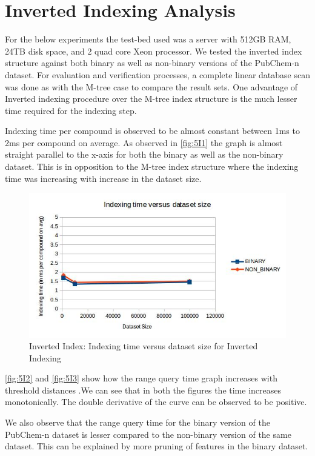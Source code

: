 \section{Inverted Indexing Analysis}

For the below experiments the test-bed used was a server with 512GB RAM, 24TB disk space, and 2 quad core Xeon processor. We tested the inverted index structure against both binary as well as non-binary versions of the PubChem-n dataset. For evaluation and verification processes, a complete linear database scan was done as with the M-tree case to compare the result sets. One advantage of Inverted indexing procedure over the M-tree index structure is the much lesser time required for the indexing step. 

Indexing time per compound is observed to be almost constant between 1ms to 2ms per compound on average. As observed in \autoref{fig:5I1} the graph is almost straight parallel to the x-axis for both the binary as well as the non-binary dataset. This is in opposition to the M-tree index structure where the indexing time was increasing with increase in the dataset size. 


\begin{figure}[ht]	
\centering
\includegraphics[width=1 \columnwidth]{img/imageI1.jpg}
\caption{Inverted Index: Indexing time versus dataset size for Inverted Indexing}
\label{fig:5I1}
\end{figure}


\autoref{fig:5I2} and \autoref{fig:5I3} show how the range query time graph increases with threshold distances .We can see that in both the figures the time increases monotonically. The double derivative of the curve can be observed to be positive. 

We also observe that the range query time for the binary version of the PubChem-n dataset is lesser compared to the non-binary version of the same dataset. This can be explained by more pruning of features in the binary dataset.

